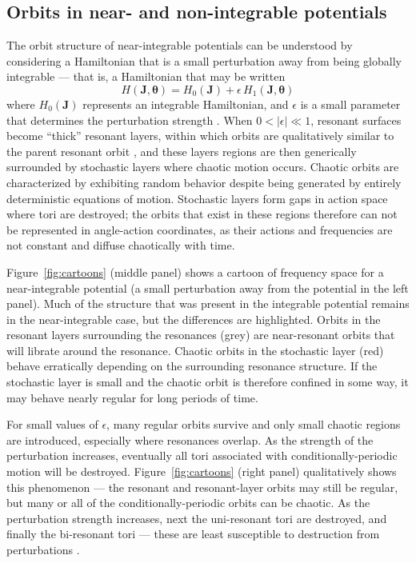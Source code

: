 \documentclass[letterpaper,12pt,preprint]{aastex}
\newcommand{\bs}[1]{\boldsymbol{#1}}
\begin{document}
\subsection{Orbits in near- and non-integrable potentials}

The orbit structure of near-integrable potentials can be understood by considering a Hamiltonian that is a small perturbation away from being globally integrable --- that is, a Hamiltonian that may be written
\begin{equation}
	H(\boldsymbol{J}, \boldsymbol{\theta}) = H_0(\boldsymbol{J}) + \epsilon \, H_1(\boldsymbol{J}, \boldsymbol{\theta})
\end{equation}
where $H_0(\bs{J})$ represents an integrable Hamiltonian, and $\epsilon$ is a small parameter that determines the perturbation strength \citep[a complete description of perturbation theory applied to nonlinear Hamiltonians is given in][]{lichtenberg83}. When $0 < |\epsilon| \ll 1$, resonant surfaces become ``thick'' resonant layers, within which orbits are qualitatively similar to the parent resonant orbit \citep[e.g.,][]{merritt99}, and these layers regions are then generically surrounded by stochastic layers where chaotic motion occurs. Chaotic orbits are characterized by exhibiting random behavior despite being generated by entirely deterministic equations of motion. Stochastic layers form gaps in action space where tori are destroyed; the orbits that exist in these regions therefore can not be represented in angle-action coordinates, as their actions and frequencies are not constant and diffuse chaotically with time. 

Figure~\ref{fig:cartoons} (middle panel) shows a cartoon of frequency space for a near-integrable potential (a small perturbation away from the potential in the left panel). Much of the structure that was present in the integrable potential remains in the near-integrable case, but the differences are highlighted. Orbits in the resonant layers surrounding the resonances (grey) are near-resonant orbits that will librate around the resonance. Chaotic orbits in the stochastic layer (red) behave erratically depending on the surrounding resonance structure. If the stochastic layer is small and the chaotic orbit is therefore confined in some way, it may behave nearly regular for long periods of time.

For small values of $\epsilon$, many regular orbits survive and only small chaotic regions are introduced, especially where resonances overlap. As the strength of the perturbation increases, eventually all tori associated with conditionally-periodic motion will be destroyed. Figure~\ref{fig:cartoons} (right panel) qualitatively shows this phenomenon --- the resonant and resonant-layer orbits may still be regular, but many or all of the conditionally-periodic orbits can be chaotic. As the perturbation strength increases, next the uni-resonant tori are destroyed, and finally the bi-resonant tori --- these are least susceptible to destruction from perturbations \cite[for a more quantitative illustration of this transition from integrability to global chaos, see Figure~9 in][]{valluri98}.
\end{document}
